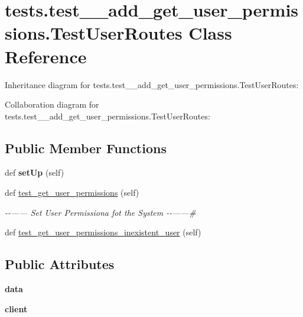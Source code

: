 \hypertarget{classtests_1_1test__9__add__get__user__permissions_1_1_test_user_routes}{}\section{tests.\+test\+\_\+\_\+add\+\_\+get\+\_\+user\+\_\+permissions.\+Test\+User\+Routes Class Reference}
\label{classtests_1_1test__9__add__get__user__permissions_1_1_test_user_routes}


Inheritance diagram for tests.\+test\+\_\+\_\+add\+\_\+get\+\_\+user\+\_\+permissions.\+Test\+User\+Routes\+:


Collaboration diagram for tests.\+test\+\_\+\_\+add\+\_\+get\+\_\+user\+\_\+permissions.\+Test\+User\+Routes\+:
\subsection*{Public Member Functions}
\begin{DoxyCompactItemize}
\item 
\mbox{\label{classtests_1_1test__9__add__get__user__permissions_1_1_test_user_routes_ab24762752f548094967f4bff0443bcaa}} 
def {\bfseries set\+Up} (self)
\item 
def \hyperlink{classtests_1_1test__9__add__get__user__permissions_1_1_test_user_routes_a51c2e523936ee6d64740ede8a5a3f84f}{test\+\_\+get\+\_\+user\+\_\+permissions} (self)
\begin{DoxyCompactList}\small\item\em -\/-\/------ Set User Permissiona fot the System -\/-\/------\# \end{DoxyCompactList}\item 
def \hyperlink{classtests_1_1test__9__add__get__user__permissions_1_1_test_user_routes_a5f2561c9f8eff8a8fcc6363a633f1ef2}{test\+\_\+get\+\_\+user\+\_\+permissions\+\_\+inexistent\+\_\+user} (self)
\end{DoxyCompactItemize}
\subsection*{Public Attributes}
\begin{DoxyCompactItemize}
\item 
\mbox{\label{classtests_1_1test__9__add__get__user__permissions_1_1_test_user_routes_a5e01712580f5adbb80a6ebba16105bdd}} 
{\bfseries data}
\item 
\mbox{\label{classtests_1_1test__9__add__get__user__permissions_1_1_test_user_routes_a86c3f5c78949423152fdfee8a2f8ce56}} 
{\bfseries client}
\end{DoxyCompactItemize}


